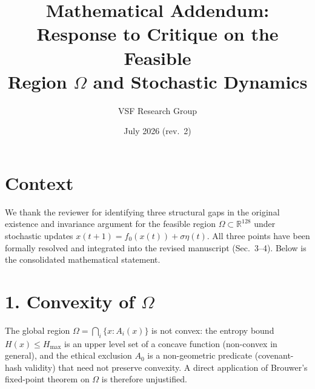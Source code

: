 \documentclass[11pt]{article}
\title{Mathematical Addendum: Response to Critique on the Feasible\\
Region $\Omega$ and Stochastic Dynamics}
\author{VSF Research Group}
\date{July 2026 (rev.\ 2)}
\newcommand{\R}{\mathbb{R}}
\begin{document}
\maketitle

\section*{Context}

We thank the reviewer for identifying three structural gaps in the original
existence and invariance argument for the feasible region
$\Omega \subset \R^{128}$ under stochastic updates
$x(t+1) = f_0(x(t)) + \sigma\eta(t)$. All three points have been formally
resolved and integrated into the revised manuscript (Sec.~3--4). Below is the
consolidated mathematical statement.

\section*{1. Convexity of $\Omega$}

The global region $\Omega = \bigcap_i \{x : A_i(x)\}$ is not convex: the
entropy bound $H(x) \le H_{\max}$ is an upper level set of a concave function
(non-convex in general), and the ethical exclusion $A_0$ is a non-geometric
predicate (covenant-hash validity) that need not preserve convexity. A direct
application of Brouwer's fixed-point theorem on $\Omega$ is therefore
unjustified.
\end{document}
